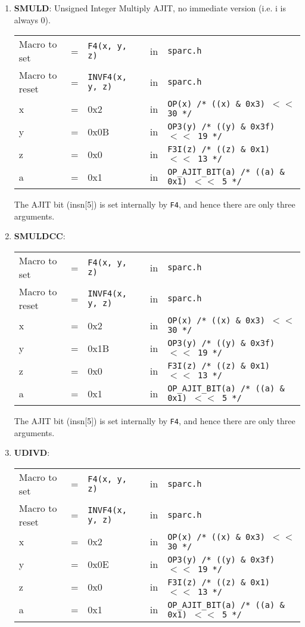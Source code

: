 \begin{itemize}
\begin{enumerate}
  \item \textbf{SMULD}: Unsigned Integer Multiply AJIT, no immediate
    version (i.e. i is always 0).\\
    \begin{tabular}[h]{lclcl}
      Macro to set  &=& \texttt{F4(x, y, z)} &in& \texttt{sparc.h}     \\
      Macro to reset  &=& \texttt{INVF4(x, y, z)} &in& \texttt{sparc.h}     \\
      x &=& 0x2      &in& \texttt{OP(x)  /* ((x) \& 0x3)  $<<$ 30 */} \\
      y &=& 0x0B     &in& \texttt{OP3(y) /* ((y) \& 0x3f) $<<$ 19 */} \\
      z &=& 0x0      &in& \texttt{F3I(z) /* ((z) \& 0x1)  $<<$ 13 */} \\
      a &=& 0x1      &in& \texttt{OP\_AJIT\_BIT(a) /* ((a) \& 0x1)  $<<$ 5 */}
    \end{tabular}

    The AJIT bit  (insn[5]) is set internally by  \texttt{F4}, and hence
    there are only three arguments.

  \item \textbf{SMULDCC}:\\
    \begin{tabular}[h]{lclcl}
      Macro to set  &=& \texttt{F4(x, y, z)} &in& \texttt{sparc.h}     \\
      Macro to reset  &=& \texttt{INVF4(x, y, z)} &in& \texttt{sparc.h}     \\
      x &=& 0x2      &in& \texttt{OP(x)  /* ((x) \& 0x3)  $<<$ 30 */} \\
      y &=& 0x1B     &in& \texttt{OP3(y) /* ((y) \& 0x3f) $<<$ 19 */} \\
      z &=& 0x0      &in& \texttt{F3I(z) /* ((z) \& 0x1)  $<<$ 13 */} \\
      a &=& 0x1      &in& \texttt{OP\_AJIT\_BIT(a) /* ((a) \& 0x1)  $<<$ 5 */}
    \end{tabular}

    The AJIT bit  (insn[5]) is set internally by  \texttt{F4}, and hence
    there are only three arguments.

  \item \textbf{UDIVD}:\\
    \begin{tabular}[h]{lclcl}
      Macro to set  &=& \texttt{F4(x, y, z)} &in& \texttt{sparc.h}     \\
      Macro to reset  &=& \texttt{INVF4(x, y, z)} &in& \texttt{sparc.h}     \\
      x &=& 0x2      &in& \texttt{OP(x)  /* ((x) \& 0x3)  $<<$ 30 */} \\
      y &=& 0x0E     &in& \texttt{OP3(y) /* ((y) \& 0x3f) $<<$ 19 */} \\
      z &=& 0x0      &in& \texttt{F3I(z) /* ((z) \& 0x1)  $<<$ 13 */} \\
      a &=& 0x1      &in& \texttt{OP\_AJIT\_BIT(a) /* ((a) \& 0x1)  $<<$ 5 */}
    \end{tabular}


\end{enumerate}
\end{itemize}
